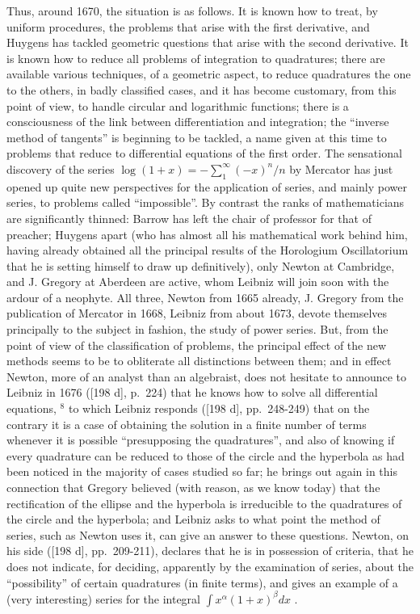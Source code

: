 Thus, around 1670, the situation is as follows. It is known how to treat, by uniform procedures, the problems that arise with the first derivative, and Huygens has tackled geometric questions that arise with the second derivative. It is known how to reduce all problems of integration to quadratures; there are available various techniques, of a geometric aspect, to reduce quadratures the one to the others, in badly classified cases, and it has become customary, from this point of view, to handle circular and logarithmic functions; there is a consciousness of the link between differentiation and integration; the ``inverse method of tangents'' is beginning to be tackled, a name given at this time to problems that reduce to differential equations of the first order. The sensational discovery of the series \(\log(1+x) = -\sum_{1}^{\infty}(-x)^{n}/n\) by Mercator has just opened up quite new perspectives for the application of series, and mainly power series, to problems called ``impossible''. By contrast the ranks of mathematicians are significantly thinned: Barrow has left the chair of professor for that of preacher; Huygens apart (who has almost all his mathematical work behind him, having already obtained all the principal results of the Horologium Oscillatorium that he is setting himself to draw up definitively), only Newton at Cambridge, and J. Gregory at Aberdeen are active, whom Leibniz will join soon with the ardour of a neophyte. All three, Newton from 1665 already, J. Gregory from the publication of Mercator in 1668, Leibniz from about 1673, devote themselves principally to the subject in fashion, the study of power series. But, from the point of view of the classification of problems, the principal effect of the new methods seems to be to obliterate all distinctions between them; and in effect Newton, more of an analyst than an algebraist, does not hesitate to announce to Leibniz in 1676 ({[}198 d{]}, p.~224) that he knows how to solve all differential equations, \(^{8}\) to which Leibniz responds ({[}198 d{]}, pp.~248-249) that on the contrary it is a case of obtaining the solution in a finite number of terms whenever it is possible ``presupposing the quadratures'', and also of knowing if every quadrature can be reduced to those of the circle and the hyperbola as had been noticed in the majority of cases studied so far; he brings out again in this connection that Gregory believed (with reason, as we know today) that the rectification of the ellipse and the hyperbola is irreducible to the quadratures of the circle and the hyperbola; and Leibniz asks to what point the method of series, such as Newton uses it, can give an answer to these questions. Newton, on his side ({[}198 d{]}, pp.~209-211), declares that he is in possession of criteria, that he does not indicate, for deciding, apparently by the examination of series, about the ``possibility'' of certain quadratures (in finite terms), and gives an example of a (very interesting) series for the integral \(\int x^{\alpha}(1 + x)^{\beta} dx\) .


